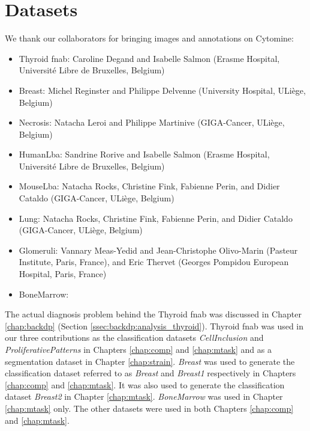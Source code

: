 \chapter{Datasets}
\label{app:datasets}

We thank our collaborators for bringing images and annotations on Cytomine:

\begin{itemize}
 \item Thyroid \acrshort{fnab}: Caroline Degand and Isabelle Salmon (Erasme Hospital, Universit\'e Libre de Bruxelles, Belgium)
 \item Breast: Michel Reginster and Philippe Delvenne (University Hospital, ULi\`ege, Belgium) 
 \item Necrosis: Natacha Leroi and Philippe Martinive (GIGA-Cancer, ULi\`ege, Belgium)
 \item HumanLba: Sandrine Rorive and Isabelle Salmon (Erasme Hospital, Universit\'e Libre de Bruxelles, Belgium) 
 \item MouseLba: Natacha Rocks, Christine Fink, Fabienne Perin, and Didier Cataldo (GIGA-Cancer, ULi\`ege, Belgium) 
 \item Lung: 
Natacha Rocks, Christine Fink, Fabienne Perin, and Didier Cataldo (GIGA-Cancer, ULi\`ege, Belgium) 
 \item Glomeruli: Vannary Meas-Yedid and Jean-Christophe Olivo-Marin (Pasteur Institute, Paris, France), and Eric Thervet (Georges Pompidou European Hospital, Paris, France)
 \item BoneMarrow: \citeauthor{kainz2017training} \cite{kainz2017training}
\end{itemize}

The actual diagnosis problem behind the Thyroid \acrshort{fnab} was discussed in Chapter \ref{chap:backdp} (Section \ref{ssec:backdp:analysis_thyroid}). Thyroid \acrshort{fnab} was used in our three contributions as the classification datasets \textit{CellInclusion} and \textit{ProliferativePatterns} in Chapters \ref{chap:comp} and \ref{chap:mtask} and as a segmentation dataset in Chapter \ref{chap:strain}. \textit{Breast} was used to generate the classification dataset referred to as \textit{Breast} and \textit{Breast1} respectively in Chapters \ref{chap:comp} and \ref{chap:mtask}. It was also used to generate the classification dataset \textit{Breast2} in Chapter \ref{chap:mtask}. \textit{BoneMarrow} was used in Chapter \ref{chap:mtask} only. The other datasets were used in both Chapters \ref{chap:comp} and \ref{chap:mtask}.


